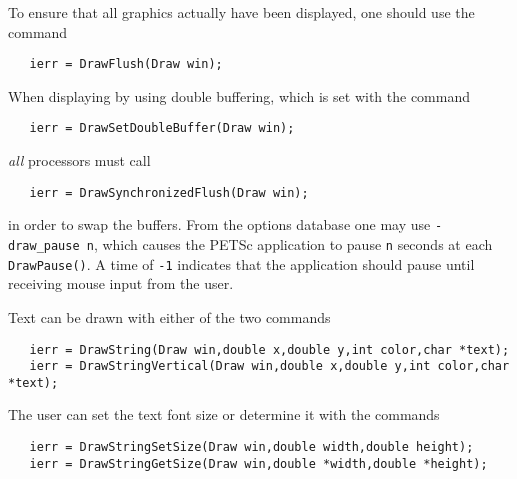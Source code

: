 {To ensure that all graphics actually have been displayed, one should use 
 the
command 
\begin{verbatim}
   ierr = DrawFlush(Draw win);
\end{verbatim}
When displaying by using double buffering, which is set with the
command  
\begin{verbatim}
   ierr = DrawSetDoubleBuffer(Draw win);
\end{verbatim}
{\em all} processors must call 
\begin{verbatim}
   ierr = DrawSynchronizedFlush(Draw win);
\end{verbatim}
in order to swap the buffers. From the options database one may use 
{\tt -draw\_pause n}, which  causes the PETSc application 
to pause {\tt n} seconds at each {\tt DrawPause()}. A time of {\tt -1}
indicates that the application should pause until receiving mouse 
input from the user.

Text can be drawn with either of the two 
commands  
\begin{verbatim}
   ierr = DrawString(Draw win,double x,double y,int color,char *text);
   ierr = DrawStringVertical(Draw win,double x,double y,int color,char *text);
\end{verbatim}
The user can set the text font size or determine it with the 
commands  
\begin{verbatim}
   ierr = DrawStringSetSize(Draw win,double width,double height);
   ierr = DrawStringGetSize(Draw win,double *width,double *height);
\end{verbatim}

}

